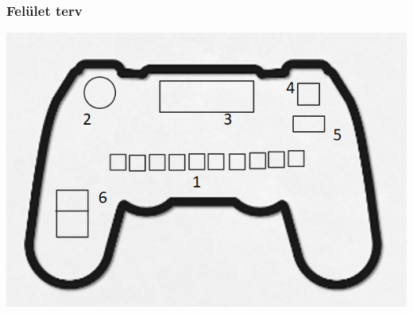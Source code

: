 \documentclass{article}
\begin{document}
\subsubsection{Felület terv}
\includegraphics[Felületterv]{fizikaitavir_feluletter.png}
\end{document}
